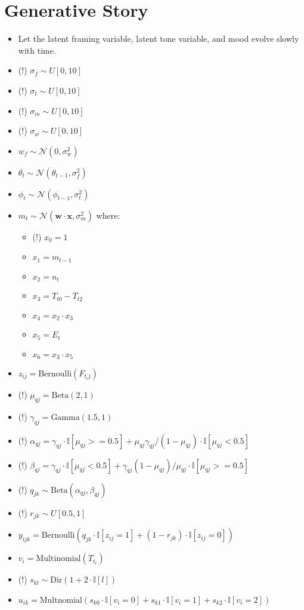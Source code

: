 \documentclass[11pt]{article}
\theoremstyle{plain}
\theoremstyle{definition}
\begin{document}
\section{Generative Story}

\begin{itemize}
\item Let the latent framing variable, latent tone variable, and mood evolve slowly with time.
\item (!) $\sigma_f \sim U[0, 10]$
\item (!) $\sigma_t \sim U[0, 10]$
\item (!) $\sigma_m \sim U[0, 10]$
\item (!) $\sigma_w \sim U[0, 10]$
\item $w_f \sim \mathcal{N}(0, \sigma_w^2)$
\item $\theta_t \sim \mathcal{N}(\theta_{t-1}, \sigma_f^2)$
\item $\phi_t \sim \mathcal{N}(\phi_{t-1}, \sigma_t^2)$
\item $m_t \sim \mathcal{N}(\mathbf{w} \cdot \mathbf{x}, \sigma_m^2)$ where:
\begin{itemize}
\item (!) $x_0 = 1$
\item $x_1 = m_{t-1}$
\item $x_2 = n_t$
\item $x_3 = T_{t0} - T_{t2}$
\item $x_4 = x_2 \cdot x_3$
\item $x_5 = E_t$
\item $x_6 = x_3 \cdot x_5$
\end{itemize}
\item $z_{ij} = \textrm{Bernoulli}(F_{t_i j})$
\item (!) $\mu_{qj} = \textrm{Beta}(2,1)$
\item (!) $\gamma_{qj} = \textrm{Gamma}(1.5,1)$
\item (!) $\alpha_{qj} = \gamma_{qj} \cdot \mathbb{I}[\mu_{qj} >= 0.5] + \mu_{qj} \gamma_{qj} / (1 - \mu_{qj}) \cdot \mathbb{I}[\mu_{qj} < 0.5]$
\item (!) $\beta_{qj} = \gamma_{qj} \cdot \mathbb{I}[\mu_{qj} < 0.5] + \gamma_{qj} (1 - \mu_{qj} ) / \mu_{qj} \cdot \mathbb{I}[\mu_{qj} >= 0.5]$
\item (!) $q_{jk} \sim \textrm{Beta}(\alpha_{qj}, \beta_{qj})$
\item (!) $r_{jk} \sim U[0.5, 1]$
\item $y_{ijk} = \textrm{Bernoulli}\left( q_{jk} \cdot \mathbb{I}[{z_{ij}}=1] + (1-r_{jk}) \cdot \mathbb{I}[z_{ij} = 0]\right)$
\item $v_{i} = \textrm{Multinomial}(T_{t_i})$
\item (!) $s_{kl} \sim \textrm{Dir}(1 + 2 \cdot \mathbb{I}[l])$
\item $u_{ik} = \textrm{Multnomial}(s_{k0} \cdot \mathbb{I}[v_i = 0] + s_{k1} \cdot \mathbb{I}[v_i = 1] + s_{k2} \cdot \mathbb{I}[v_i = 2]) $

\end{itemize}
\end{document}
